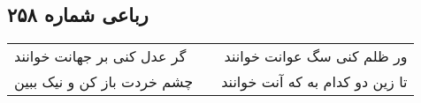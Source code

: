 \begin{center}
\section*{رباعی شماره ۲۵۸}
\label{sec:sh258}
\begin{longtable}{l p{0.5cm} r}
گر عدل کنی بر جهانت خوانند
&&
ور ظلم کنی سگ عوانت خوانند
\\
چشم خردت باز کن و نیک ببین
&&
تا زین دو کدام به که آنت خوانند
\\
\end{longtable}
\end{center}
